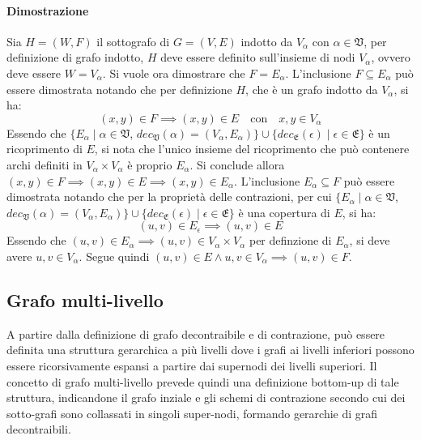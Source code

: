     \paragraph{Dimostrazione}
    Sia $H = (W, F)$ il sottografo di $G = (V, E)$ indotto da $V_\alpha$ con
    $\alpha \in \mathfrak{V}$, per definizione di grafo indotto, $H$ deve essere definito sull'insieme di nodi
    $V_\alpha$, ovvero deve essere $W = V_\alpha$.
    Si vuole ora dimostrare che $F = E_\alpha$. \newline
    L'inclusione $F \subseteq E_\alpha$ pu\`o essere dimostrata notando che per definizione $H$,
    che \`e un grafo indotto da $V_\alpha$, si ha:
    \begin{equation*}
    (x, y) \in F \implies (x, y) \in E \quad \text{con} \quad x, y \in V_{\alpha}
    \end{equation*}
    Essendo che $\{ E_\alpha \mid \alpha \in \mathfrak{V}$, $dec_\mathfrak{V}(\alpha) = (V_\alpha, E_\alpha)\} \cup \{ dec_\mathfrak{E}(\epsilon) \mid \epsilon \in \mathfrak{E}\} $ \`e un ricoprimento di
    $E$, si nota che l'unico insieme del ricoprimento che pu\`o contenere archi definiti in $V_\alpha \times V_\alpha$ \`e proprio $E_\alpha$.
    Si conclude allora $(x, y) \in F \implies (x, y) \in E \implies (x, y) \in E_\alpha $. \newline
    L'inclusione $E_\alpha \subseteq F$ pu\`o essere dimostrata notando che per la propriet\`a delle contrazioni, per cui
    $\{ E_\alpha \mid \alpha \in \mathfrak{V}$, $dec_\mathfrak{V}(\alpha) = (V_\alpha, E_\alpha)\} \cup \{dec_\mathfrak{E}(\epsilon) \mid \epsilon \in \mathfrak{E}\} $ \`e una copertura di $E$, si ha:
    \begin{equation*}
    (u, v) \in E_\epsilon \implies (u, v) \in E
    \end{equation*}
    Essendo che  $(u, v) \in E_\alpha \implies (u, v) \in V_\alpha \times V_\alpha$ per definzione di $E_\alpha$, si deve avere $u, v \in V_\alpha$.
    Segue quindi $(u, v) \in E \wedge u,v \in V_\alpha \implies (u, v) \in F$.

    \newpage

    \subsection{Grafo multi-livello}\label{subsec:grafo-multi-livello}

    A partire dalla definizione di grafo decontraibile e di contrazione, pu\`o essere definita una struttura gerarchica
    a pi\`u livelli dove i grafi ai livelli inferiori possono essere ricorsivamente espansi a partire dai supernodi dei
    livelli superiori.
    Il concetto di grafo multi-livello prevede quindi una definizione bottom-up di tale struttura, indicandone il
    grafo inziale e gli schemi di contrazione secondo cui dei sotto-grafi sono collassati in singoli super-nodi,
    formando gerarchie di grafi decontraibili.


